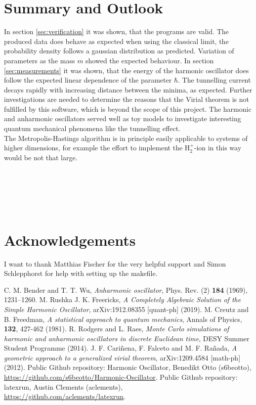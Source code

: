 \documentclass{scrartcl}
\begin{document}
	\section{Summary and Outlook}
		In section \ref{sec:verification} it was shown, that the programs are valid.
		The produced data does behave as expected when using the classical limit, the probability density follows a gaussian distribution as predicted.
		Variation of parameters as the mass $m$ showed the expected behaviour.
		In section \ref{sec:measurements} it was shown, that the energy of the harmonic oscillator does follow the expected linear dependence of the parameter $\hbar$.
		The tunnelling current decays rapidly with increasing distance between the minima, as expected.
		Further investigations are needed to determine the reasons that the Virial theorem is not fulfilled by this software, which is beyond the scope of this project.
		The harmonic and anharmonic oscillators served well as toy models to investigate interesting quantum mechanical phenomena like the tunnelling effect.
		\\
		The Metropolis-Hastings algorithm is in principle easily applicable to systems of higher dimensions, for example the effort to implement the H$_2^+$-ion in this way would be not that large.
		\\\\\\\\\\\\
	\section{Acknowledgements}
		I want to thank Matthias Fischer for the very helpful support and Simon Schlepphorst for help with setting up the makefile.

	\newpage
	\begin{thebibliography}{widestlabel}
		 C. M. Bender and T. T. Wu, \textit{Anharmonic oscillator}, Phys. Rev. (2) \textbf{184} (1969), 1231–1260.
		 M. Rushka J. K. Freericks, \textit{A Completely Algebraic Solution of the Simple Harmonic Oscillator}, arXiv:1912.08355 [quant-ph] (2019).
		 M. Creutz and B. Freedman, \textit{A statistical approach to quantum mechanics}, Annals of Physics, \textbf{132}, 427-462 (1981).
		 R. Rodgers and L. Raes, \textit{Monte Carlo simulations of harmonic and anharmonic oscillators in discrete Euclidean time}, DESY Summer Student Programme (2014).
		 J. F. Cari\~{n}ena, F. Falceto and M. F. Ra\~{n}ada, \textit{A geometric approach to a generalized virial theorem}, arXiv:1209.4584 [math-ph] (2012).
		 Public Github repository: Harmonic Oscillator, Benedikt Otto (s6beotto), \\\url{https://github.com/s6beotto/Harmonic-Oscillator}.
		 Public Github repository: latexrun, Austin Clements (aclements), \\\url{https://github.com/aclements/latexrun}.
	\end{thebibliography}
	\appendix
\end{document}
